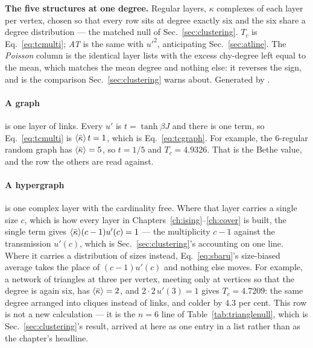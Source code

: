 \begin{table}[t]
\centering\small
\begin{adjustbox}{max width=\linewidth}

\end{adjustbox}
\caption{\textbf{The five structures at one degree.} Regular layers, $\kappa$
complexes of each layer per vertex, chosen so that every row sits at degree
exactly six and the six share a degree distribution --- the matched null of
Sec.~\ref{sec:clustering}. $T_{c}$ is Eq.~\eqref{eq:tcmulti}; \emph{AT} is the
same with $u'^{2}$, anticipating Sec.~\ref{sec:atline}. The \emph{Poisson}
column is the identical layer lists with the excess chy-degree left equal to
the mean, which matches the mean degree and nothing else: it reverses the sign,
and is the comparison Sec.~\ref{sec:clustering} warns about. Generated by
.}
\label{tab:fiveising}
\end{table}

\paragraph{A graph} is one layer of links. Every $u'$ is $t=\tanh\beta J$ and
there is one term, so Eq.~\eqref{eq:tcmulti} is $\langle \bar\kappa \rangle\,t=1$, which is
Eq.~\eqref{eq:tcgraph}. For example, the $6$-regular random graph has
$\langle \bar\kappa \rangle=5$, so $t=1/5$ and $T_{c}=4.9326$. That is the Bethe value, and
the row the others are read against.

\paragraph{A hypergraph} is one complex layer with the cardinality free. Where
that layer carries a single size $c$, which is how every layer in
Chapters~\ref{ch:ising}--\ref{ch:cover} is built, the single term gives
$\langle \bar\kappa \rangle(c-1)u'(c)=1$ --- the multiplicity $c-1$ against the transmission
$u'(c)$, which is Sec.~\ref{sec:clustering}'s accounting on one line. Where it
carries a distribution of sizes instead, Eq.~\eqref{eq:sbaru}'s size-biased
average takes the place of $(c-1)u'(c)$ and nothing else moves. For
example, a network of triangles at three per vertex, meeting only at vertices so
that the degree is again six, has $\langle \bar\kappa \rangle=2$, and $2\cdot2\,u'(3)=1$ gives
$T_{c}=4.7209$: the same degree arranged into cliques instead of links, and
colder by $4.3$ per cent. This row is
not a new calculation --- it is the $n=6$ line of Table~\ref{tab:trianglenull},
which is Sec.~\ref{sec:clustering}'s result, arrived at here as one entry in a
list rather than as the chapter's headline.

